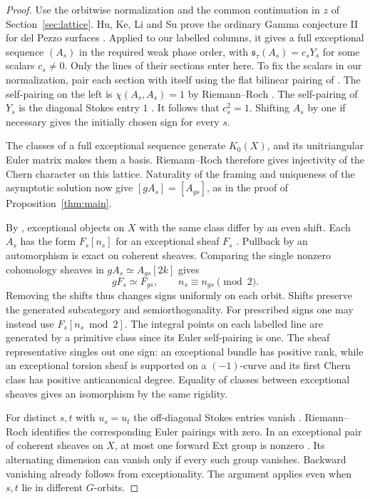 \begin{proof}
Use the orbitwise normalization and the common continuation in $z$ of Section~\ref{sec:lattice}. Hu, Ke, Li and Su prove the ordinary Gamma conjecture II for del Pezzo surfaces \cite[Theorem~1.4 and \S2.3]{HKLS}. Applied to our labelled columns, it gives a full exceptional sequence $(A_s)$ in the required weak phase order, with $\mathfrak{s}_\tau(A_s)=c_sY_s$ for some scalars $c_s\ne0$. Only the lines of their sections enter here. To fix the scalars in our normalization, pair each section with itself using the flat bilinear pairing of \cite[\S3.4]{GGI}. The self-pairing on the left is $\chi(A_s,A_s)=1$ by Riemann--Roch \cite[Lemma~3.4.6]{GGI}. The self-pairing of $Y_s$ is the diagonal Stokes entry $1$ \cite[Proposition~2.6.4]{GGI}. It follows that $c_s^2=1$. Shifting $A_s$ by one if necessary gives the initially chosen sign for every $s$.

The classes of a full exceptional sequence generate $K_0(X)$, and its unitriangular Euler matrix makes them a basis. Riemann--Roch therefore gives injectivity of the Chern character on this lattice. Naturality of the framing and uniqueness of the asymptotic solution now give $[gA_s]=[A_{gs}]$, as in the proof of Proposition~\ref{thm:main}.

By \cite[Lemma~4.11]{Krah}, exceptional objects on $X$ with the same class differ by an even shift. Each $A_s$ has the form $F_s[n_s]$ for an exceptional sheaf $F_s$ \cite[Propositions~2.9--2.10]{KO}. Pullback by an automorphism is exact on coherent sheaves. Comparing the single nonzero cohomology sheaves in $gA_s\simeq A_{gs}[2k]$ gives
\[
               gF_s\simeq F_{gs},\qquad n_s\equiv n_{gs}\pmod 2 .
\]
Removing the shifts thus changes signs uniformly on each orbit. Shifts preserve the generated subcategory and semiorthogonality. For prescribed signs one may instead use $F_s[n_s\bmod 2]$. The integral points on each labelled line are generated by a primitive class since its Euler self-pairing is one. The sheaf representative singles out one sign: an exceptional bundle has positive rank, while an exceptional torsion sheaf is supported on a $(-1)$-curve and its first Chern class has positive anticanonical degree. Equality of classes between exceptional sheaves gives an isomorphism by the same rigidity.

For distinct $s,t$ with $u_s=u_t$ the off-diagonal Stokes entries vanish \cite[Proposition~2.6.4]{GGI}. Riemann--Roch identifies the corresponding Euler pairings with zero. In an exceptional pair of coherent sheaves on $X$, at most one forward Ext group is nonzero \cite[Corollary~2.11]{KO}. Its alternating dimension can vanish only if every such group vanishes. Backward vanishing already follows from exceptionality. The argument applies even when $s,t$ lie in different $G$-orbits.


\end{proof}
